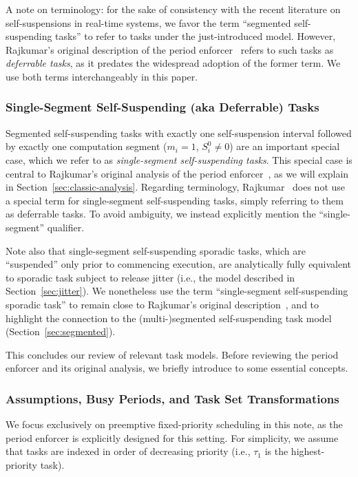 A note on terminology: for the sake of consistency with the recent literature on self-suspensions in real-time systems, we favor the term ``segmented self-suspending tasks'' to refer to tasks under the just-introduced model. However,  Rajkumar's original description of the period enforcer~\cite{Raj:suspension1991} refers to such tasks as  \emph{deferrable tasks}, as it predates the widespread adoption of the former term. We use both terms interchangeably in this paper.


\subsubsection{Single-Segment Self-Suspending (aka Deferrable) Tasks}
\label{sec:single-segmented}

Segmented self-suspending tasks with exactly one self-suspension interval followed by exactly one computation segment ($m_i = 1$, $S_i^0 \neq 0$) are an important special case, which we refer to as \emph{single-segment self-suspending tasks}.  This special case is central to Rajkumar's original analysis of the period enforcer~\cite{Raj:suspension1991},  as we will explain in Section~\ref{sec:classic-analysis}.
Regarding terminology, Rajkumar~\cite{Raj:suspension1991} does not use a special term for single-segment self-suspending tasks, simply referring to them as deferrable tasks. To avoid ambiguity, we instead explicitly mention the ``single-segment'' qualifier.  

Note also that single-segment self-suspending sporadic tasks, which are  ``suspended'' only prior to commencing execution, are analytically fully equivalent to sporadic task subject to release jitter (i.e., the model described in Section~\ref{sec:jitter}). We nonetheless use the term ``single-segment self-suspending sporadic task'' to remain close to Rajkumar's original description~\cite{Raj:suspension1991}, and to highlight the connection to the (multi-)segmented self-suspending task model (Section~\ref{sec:segmented}).

This concludes our review of relevant task models. Before reviewing the period enforcer and its original analysis, we briefly introduce to some essential concepts.

\subsubsection{Assumptions, Busy Periods, and Task Set Transformations}
\label{sec:misc-defs}

We focus exclusively on preemptive fixed-priority scheduling in this note, as the period enforcer is explicitly designed for this setting. For simplicity, we assume that tasks are indexed in order of decreasing priority (i.e., $\tau_1$ is the highest-priority task). 

